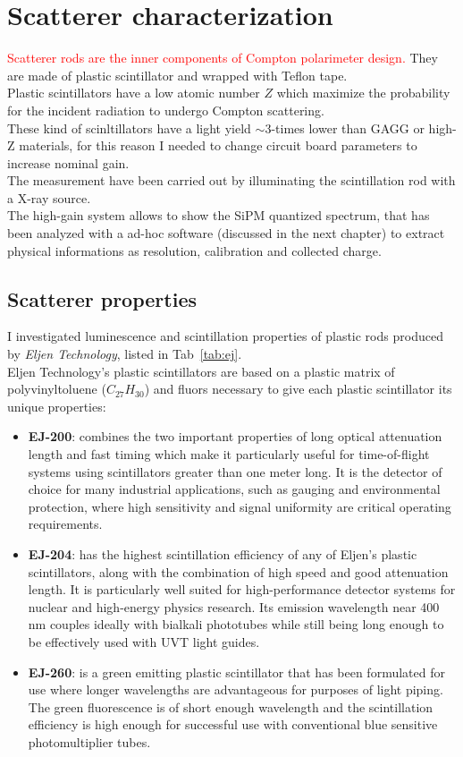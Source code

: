 \documentclass[10pt,a4paper, openany]{book}
\begin{document}
\chapter{Scatterer characterization}
\textcolor{red}{Scatterer rods are the inner components of Compton polarimeter design.} They are made of plastic scintillator and wrapped with Teflon tape.\\  
Plastic scintillators have a low atomic number $Z$ which maximize the probability for the incident radiation to undergo Compton scattering.\\
These kind of scinltillators have a light yield $\sim$3-times lower than GAGG or high-Z materials, for this reason I needed to change circuit board parameters to increase nominal gain.\\
The measurement have been carried out by illuminating the scintillation rod with a X-ray source.\\
The high-gain system allows to show the SiPM quantized spectrum, that has been analyzed with a ad-hoc software (discussed in the next chapter) to extract physical informations as resolution, calibration and collected charge. 


\section{Scatterer properties}
I investigated luminescence and scintillation properties of plastic rods produced by \emph{Eljen Technology}, listed in Tab~\ref{tab:ej}.\\
Eljen Technology's plastic scintillators are based on a plastic matrix of polyvinyltoluene ($C_{27} H_{30}$) and fluors necessary to give each plastic scintillator its unique properties:
\begin{itemize}
\item \textbf{EJ-200}: combines the two important properties of long optical attenuation length and fast timing which make it particularly useful for time-of-flight systems using scintillators greater than one meter long. It is the detector of choice for many industrial applications, such as gauging and environmental protection, where high sensitivity and signal uniformity are critical operating requirements.~\cite{ej:1}
\item \textbf{EJ-204}: has the highest scintillation efficiency of any of Eljen’s plastic scintillators, along with the combination of high speed and good attenuation length. It is particularly well suited for high-performance detector systems for nuclear and high-energy physics research. Its emission wavelength near 400 nm couples ideally with bialkali phototubes while still being long enough to be effectively used with UVT light guides.~\cite{ej:1}

\item \textbf{EJ-260}: is a green emitting plastic scintillator that has been formulated for use where longer wavelengths are advantageous for purposes of light piping. The green fluorescence is of short enough wavelength and the scintillation efficiency is high enough for successful use with conventional blue sensitive photomultiplier tubes.~\cite{ej:2}
\end{itemize}
\end{document}
